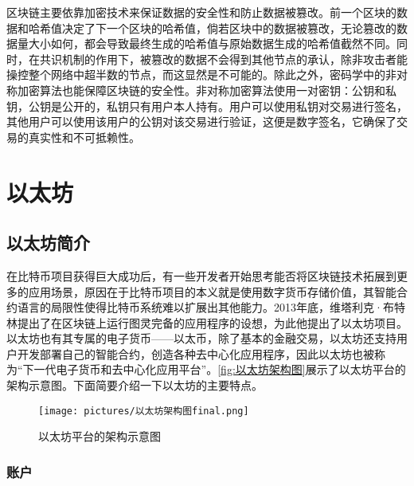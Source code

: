     区块链主要依靠加密技术来保证数据的安全性和防止数据被篡改。前一个区块的数据和哈希值决定了下一个区块的哈希值，倘若区块中的数据被篡改，无论篡改的数据量大小如何，都会导致最终生成的哈希值与原始数据生成的哈希值截然不同。同时，在共识机制的作用下，被篡改的数据不会得到其他节点的承认，除非攻击者能操控整个网络中超半数的节点，而这显然是不可能的。除此之外，密码学中的非对称加密算法也能保障区块链的安全性。非对称加密算法使用一对密钥：公钥和私钥，公钥是公开的，私钥只有用户本人持有。用户可以使用私钥对交易进行签名，其他用户可以使用该用户的公钥对该交易进行验证，这便是数字签名，它确保了交易的真实性和不可抵赖性。
    


\section{以太坊}
\label{sec:以太坊}
\subsection{以太坊简介}
\label{sec:以太坊简介}
在比特币项目获得巨大成功后，有一些开发者开始思考能否将区块链技术拓展到更多的应用场景，原因在于比特币项目的本义就是使用数字货币存储价值，其智能合约语言的局限性使得比特币系统难以扩展出其他能力。2013年底，维塔利克·布特林提出了在区块链上运行图灵完备的应用程序的设想，为此他提出了以太坊项目。以太坊也有其专属的电子货币——以太币，除了基本的金融交易，以太坊还支持用户开发部署自己的智能合约，创造各种去中心化应用程序，因此以太坊也被称为“下一代电子货币和去中心化应用平台”。\autoref{fig:以太坊架构图}展示了以太坊平台的架构示意图。下面简要介绍一下以太坊的主要特点。
\begin{figure}[htbp]
    \centering
    \texttt{[image: pictures/以太坊架构图final.png]}
    \caption{\label{fig:以太坊架构图}以太坊平台的架构示意图}
\end{figure}
\subsubsection{账户}
    
